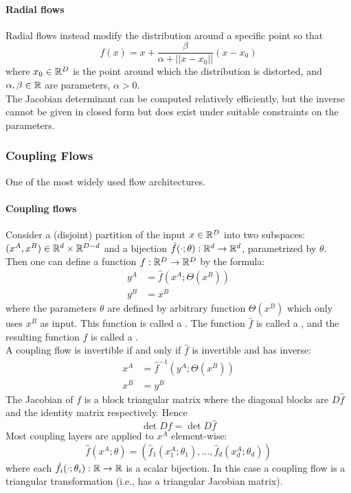 \documentclass[11pt]{article}
\begin{document}
\paragraph{Radial flows}
Radial flows instead modify the distribution around a specific point so that
$$f(x) = x + \frac{\beta}{\alpha + ||x - x_0||}(x - x_0)$$
where $x_0 \in \mathbb{R}^D$ is the point around which the distribution is distorted, and $\alpha, \beta \in \mathbb{R}$ are parameters, $\alpha > 0$.\\
The Jacobian determinant can be computed relatively efficiently, but the inverse cannot be given in closed form but does exist under suitable constraints on the parameters.\\

\subsubsection{Coupling Flows}
One of the most widely used flow architectures.
\paragraph{Coupling flows}
Consider a (disjoint) partition of the input $x \in \mathbb{R}^D$ into two subspaces: $(x^A,x^B) \in \mathbb{R}^d \times \mathbb{R}^{D-d}$ and a bijection $\hat{f}(\cdot; \theta): \mathbb{R}^d \rightarrow \mathbb{R}^d$, parametrized by $\theta$. Then one can define a function $f: \mathbb{R}^D \rightarrow \mathbb{R}^D$ by the formula:
\begin{align*}
	y^A &= \hat{f}(x^A;\Theta(x^B))\\
	y^B &= x^B
\end{align*}
where the parameters $\theta$ are defined by arbitrary function $\Theta(x^B)$ which only uses $x^B$ as input. This function is called a . The function $\hat{f}$ is called a , and the resulting function $f$ is called a .\\
A coupling flow is invertible if and only if $\hat{f}$ is invertible and has inverse:
\begin{align*}
	x^A &= \hat{f}^{-1}(y^A;\Theta(x^B))\\
	x^B &= y^B
\end{align*}
The Jacobian of $f$ is a block triangular matrix where the diagonal blocks are $D\hat{f}$ and the identity matrix respectively. Hence 
$$\det Df = \det D\hat{f}$$
Most coupling layers are applied to $x^A$ element-wise:
$$\hat{f}(x^A;\theta) = (\hat{f}_1(x_1^A;\theta_1),\hdots,\hat{f}_d(x_d^A;\theta_d))$$
where each $\hat{f}_i(\cdot;\theta_i):\mathbb{R} \rightarrow\mathbb{R}$ is a scalar bijection. In this case a coupling flow is a triangular transformation (i.e., has a triangular Jacobian matrix).\\
\end{document}
